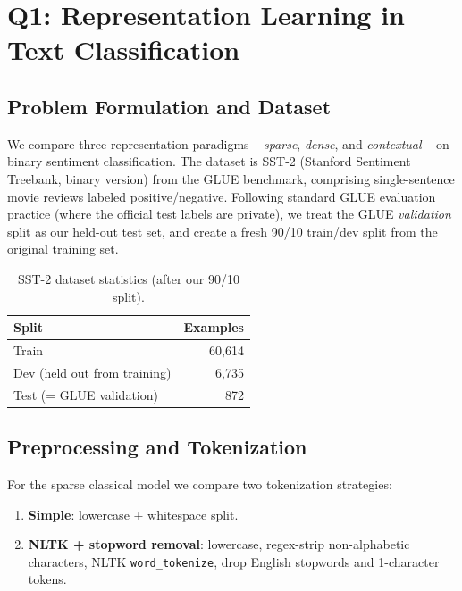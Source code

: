 \documentclass[11pt,a4paper]{article}
\begin{document}
\section{Q1: Representation Learning in Text Classification}

\subsection{Problem Formulation and Dataset}

We compare three representation paradigms -- \emph{sparse}, \emph{dense}, and \emph{contextual} -- on binary sentiment classification. The dataset is SST-2 (Stanford Sentiment Treebank, binary version) from the GLUE benchmark, comprising single-sentence movie reviews labeled positive/negative. Following standard GLUE evaluation practice (where the official test labels are private), we treat the GLUE \emph{validation} split as our held-out test set, and create a fresh 90/10 train/dev split from the original training set.

\begin{table}[h!]
\centering
\small
\caption{SST-2 dataset statistics (after our 90/10 split).}
\begin{tabular}{lr}
\toprule
\textbf{Split} & \textbf{Examples}\\
\midrule
Train & 60{,}614\\
Dev (held out from training) & 6{,}735\\
Test (= GLUE validation) & 872\\
\bottomrule
\end{tabular}
\end{table}

\subsection{Preprocessing and Tokenization}

For the sparse classical model we compare two tokenization strategies:
\vspace{-0.3em}
\begin{enumerate}[noitemsep,leftmargin=1.4em]
    \item \textbf{Simple}: lowercase + whitespace split.
    \item \textbf{NLTK + stopword removal}: lowercase, regex-strip non-alphabetic characters, NLTK \texttt{word\_tokenize}, drop English stopwords and 1-character tokens.
\end{enumerate}
\vspace{-0.3em}
\end{document}
